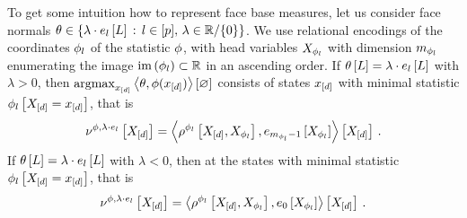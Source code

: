 \begin{example}
	To get some intuition how to represent face base measures, let us consider face normals $\theta\in\{\lambda\cdot e_{l}\left[L\right] \, : \, l\in[p], \, \lambda\in\mathbb{R}/\{0\}\}$.
	We use relational encodings of the coordinates $\phi_{l}$ of the statistic $\phi$, with head variables $X_{\phi_{l}}$ with dimension $m_{\phi_{l}}$ enumerating the image $\mathrm{im}\left(\phi_{l}\right)\subset\mathbb{R}$ in an ascending order.
	If $\theta\left[L\right]=\lambda\cdot e_{l}\left[L\right]$ with $\lambda>0$, then $\mathrm{argmax}_{x_{[d]}} \left\langle \theta,\phi(x_{[d]})\right\rangle \left[ \varnothing \right]$ consists of states $x_{[d]}$ with minimal statistic $\phi_{l}\left[X_{[d]}=x_{[d]}\right]$, that is
		\[  \nu^{\phi,\lambda\cdot e_{l}}\left[X_{[d]}\right]
		 = \left\langle \rho^{\phi_{l}}\left[X_{[d]},X_{\phi_{l}}\right],
		 e_{m_{\phi_{l}}-1}\left[X_{\phi_{l}}\right]\right\rangle \left[ X_{[d]} \right]  \, . \]		
	If $\theta\left[L\right]=\lambda\cdot e_{l}\left[L\right]$ with $\lambda<0$, then at the states with minimal statistic $\phi_{l}\left[X_{[d]}=x_{[d]}\right]$, that is
		\[  \nu^{\phi,\lambda\cdot e_{l}}\left[X_{[d]}\right]
		 = \left\langle \rho^{\phi_{l}}\left[X_{[d]},X_{\phi_{l}}\right],
		 e_{0}\left[X_{\phi_{l}}\right]\right\rangle \left[ X_{[d]} \right]  \, . \]
\end{example}



